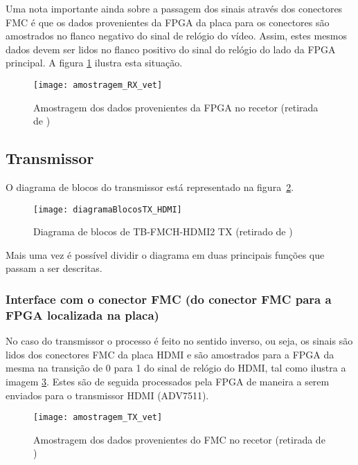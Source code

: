 Uma nota importante ainda sobre a passagem dos sinais através dos conectores FMC é que os dados provenientes da FPGA da placa para os conectores são amostrados no flanco negativo do sinal de relógio do vídeo. Assim, estes mesmos dados devem ser lidos no flanco positivo do sinal do relógio do lado da FPGA principal. A figura \ref{fig:HDMIamostragemRX}  ilustra esta situação.

\begin{figure}[h!]
	\begin{center}
		\leavevmode
		\texttt{[image: amostragem\_RX\_vet]}
		\caption[Amostragem dos dados provenientes da FPGA no recetor]{Amostragem dos dados provenientes da FPGA no recetor (retirada de \cite{R009})}
		\label{fig:HDMIamostragemRX}
	\end{center}
\end{figure}
 


\subsection{Transmissor}\label{subsec:TX} 

O diagrama de blocos do transmissor está representado na figura~\ref{fig:HDMIblocosTX}.

\begin{figure}[h!]
	\begin{center}
		\leavevmode
		\texttt{[image: diagramaBlocosTX\_HDMI]}
		\caption[Diagrama de blocos de TB-FMCH-HDMI2 TX]{Diagrama de blocos de TB-FMCH-HDMI2 TX (retirado de \cite{R009})}
		\label{fig:HDMIblocosTX}
	\end{center}
\end{figure}
Mais uma vez é possível dividir o diagrama em duas principais funções que passam a ser descritas.

\subsubsection{Interface com o conector FMC (do conector FMC para a FPGA localizada na placa)}
No caso do transmissor o processo é feito no sentido inverso, ou seja, os sinais são lidos dos conectores FMC da placa HDMI e são amostrados para a FPGA da mesma na transição de 0 para 1 do sinal de relógio do HDMI, tal como ilustra a imagem \ref{fig:HDMIamostragemTX}. Estes são de seguida processados pela FPGA de maneira a serem enviados para o transmissor HDMI (ADV7511).

	\begin{figure}[h!]
	\begin{center}
		\leavevmode
		\texttt{[image: amostragem\_TX\_vet]}
		\caption[Amostragem dos dados provenientes do FMC no recetor]{Amostragem dos dados provenientes do FMC no recetor (retirada de \cite{R009})}
		\label{fig:HDMIamostragemTX}
	\end{center}
\end{figure}


